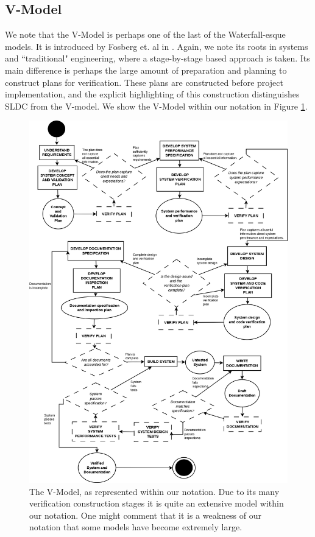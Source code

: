 \subsection{V-Model}

We note that the V-Model is perhaps one of the last of the Waterfall-esque models.
It is introduced by Fosberg et. al in \cite{forsberg1995relationship}.
Again, we note its roots in systems and ``traditional" engineering, where a stage-by-stage based
approach is taken.
Its main difference is perhaps the large amount of preparation and planning to construct plans for
verification.
These plans are constructed before project implementation, and the explicit highlighting of this
construction distinguishes SLDC from the V-model.
We show the V-Model within our notation in Figure \ref{VModel}.

\begin{figure}[ht!]
	\includegraphics[scale=0.3]{media/VModel}
	\caption{The V-Model, as represented within our notation. Due to its many verification construction stages it is quite an extensive
		model within our notation. One might comment that it is a weakness of our notation that some
			models have become extremely large.}
	\label{VModel}
\end{figure}

